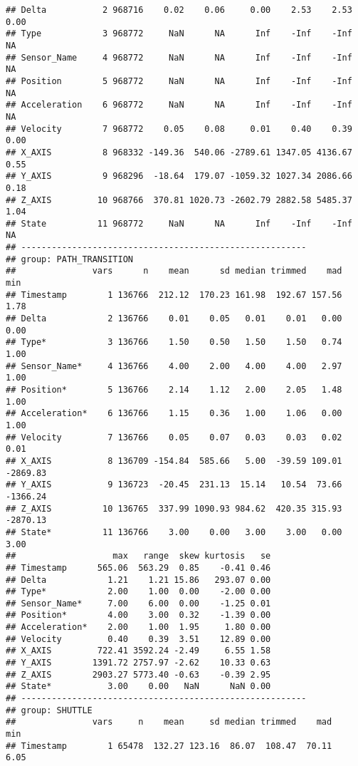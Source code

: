 \documentclass[]{article}
\begin{document}
\begin{verbatim}
## Delta           2 968716    0.02    0.06     0.00    2.53    2.53 0.00
## Type            3 968772     NaN      NA      Inf    -Inf    -Inf   NA
## Sensor_Name     4 968772     NaN      NA      Inf    -Inf    -Inf   NA
## Position        5 968772     NaN      NA      Inf    -Inf    -Inf   NA
## Acceleration    6 968772     NaN      NA      Inf    -Inf    -Inf   NA
## Velocity        7 968772    0.05    0.08     0.01    0.40    0.39 0.00
## X_AXIS          8 968332 -149.36  540.06 -2789.61 1347.05 4136.67 0.55
## Y_AXIS          9 968296  -18.64  179.07 -1059.32 1027.34 2086.66 0.18
## Z_AXIS         10 968766  370.81 1020.73 -2602.79 2882.58 5485.37 1.04
## State          11 968772     NaN      NA      Inf    -Inf    -Inf   NA
## -------------------------------------------------------- 
## group: PATH_TRANSITION
##               vars      n    mean      sd median trimmed    mad      min
## Timestamp        1 136766  212.12  170.23 161.98  192.67 157.56     1.78
## Delta            2 136766    0.01    0.05   0.01    0.01   0.00     0.00
## Type*            3 136766    1.50    0.50   1.50    1.50   0.74     1.00
## Sensor_Name*     4 136766    4.00    2.00   4.00    4.00   2.97     1.00
## Position*        5 136766    2.14    1.12   2.00    2.05   1.48     1.00
## Acceleration*    6 136766    1.15    0.36   1.00    1.06   0.00     1.00
## Velocity         7 136766    0.05    0.07   0.03    0.03   0.02     0.01
## X_AXIS           8 136709 -154.84  585.66   5.00  -39.59 109.01 -2869.83
## Y_AXIS           9 136723  -20.45  231.13  15.14   10.54  73.66 -1366.24
## Z_AXIS          10 136765  337.99 1090.93 984.62  420.35 315.93 -2870.13
## State*          11 136766    3.00    0.00   3.00    3.00   0.00     3.00
##                   max   range  skew kurtosis   se
## Timestamp      565.06  563.29  0.85    -0.41 0.46
## Delta            1.21    1.21 15.86   293.07 0.00
## Type*            2.00    1.00  0.00    -2.00 0.00
## Sensor_Name*     7.00    6.00  0.00    -1.25 0.01
## Position*        4.00    3.00  0.32    -1.39 0.00
## Acceleration*    2.00    1.00  1.95     1.80 0.00
## Velocity         0.40    0.39  3.51    12.89 0.00
## X_AXIS         722.41 3592.24 -2.49     6.55 1.58
## Y_AXIS        1391.72 2757.97 -2.62    10.33 0.63
## Z_AXIS        2903.27 5773.40 -0.63    -0.39 2.95
## State*           3.00    0.00   NaN      NaN 0.00
## -------------------------------------------------------- 
## group: SHUTTLE
##               vars     n    mean     sd median trimmed    mad      min
## Timestamp        1 65478  132.27 123.16  86.07  108.47  70.11     6.05

\end{verbatim}
\end{document}
